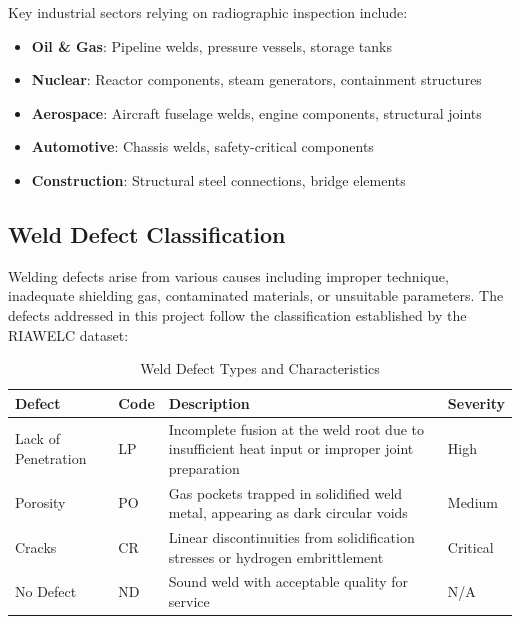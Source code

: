 \documentclass[12pt,a4paper]{report}
\begin{document}
Key industrial sectors relying on radiographic inspection include:

\begin{itemize}
    \item \textbf{Oil \& Gas}: Pipeline welds, pressure vessels, storage tanks
    \item \textbf{Nuclear}: Reactor components, steam generators, containment structures
    \item \textbf{Aerospace}: Aircraft fuselage welds, engine components, structural joints
    \item \textbf{Automotive}: Chassis welds, safety-critical components
    \item \textbf{Construction}: Structural steel connections, bridge elements
\end{itemize}

\subsection{Weld Defect Classification}

Welding defects arise from various causes including improper technique, inadequate shielding gas, contaminated materials, or unsuitable parameters. The defects addressed in this project follow the classification established by the RIAWELC dataset:

\begin{table}[H]
\centering
\caption{Weld Defect Types and Characteristics}
\label{tab:defect_types}
\begin{tabular}{llp{8cm}l}
\toprule
\textbf{Defect} & \textbf{Code} & \textbf{Description} & \textbf{Severity} \\
\midrule
Lack of Penetration & LP & Incomplete fusion at the weld root due to insufficient heat input or improper joint preparation & High \\
Porosity & PO & Gas pockets trapped in solidified weld metal, appearing as dark circular voids & Medium \\
Cracks & CR & Linear discontinuities from solidification stresses or hydrogen embrittlement & Critical \\
No Defect & ND & Sound weld with acceptable quality for service & N/A \\
\bottomrule
\end{tabular}
\end{table}
\end{document}
